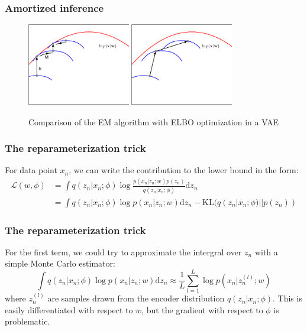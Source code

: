 \documentclass{beamer}
\begin{document}
\begin{frame}
    \frametitle{Amortized inference}
    \begin{figure}
        \caption{Comparison of the EM algorithm with ELBO optimization in a VAE}
        \includegraphics[width=0.4\textwidth]{Figure_9_a.pdf}
        \includegraphics[width=0.4\textwidth]{Figure_9_b.pdf}
    \end{figure}
\end{frame}

\begin{frame}
    \frametitle{The reparameterization trick}
    For data point $x_{n}$, we can write the contribution to the lower bound in the form:
    \begin{align*}
        \mathcal{L}(w,\phi)&=\int{}q(z_{n}|x_{n};\phi)\log\frac{p(x_{n}|z_{n};w)p(z_{n})}{q(z_{n}|x_{n};\phi)}\mathrm{d}z_{n} \\
        &=\int{}q(z_{n}|x_{n};\phi)\log{}p(x_{n}|z_{n};w)\mathrm{d}z_{n}-\mathrm{KL}(q(z_{n}|x_{n};\phi)||p(z_{n}))
    \end{align*}
\end{frame}

\begin{frame}
    \frametitle{The reparameterization trick}
    For the first term, we could try to approximate the intergral over $z_{n}$ with a simple Monte Carlo estimator:
    \begin{equation*}
        \int{}q(z_{n}|x_{n};\phi)\log{}p(x_{n}|z_{n};w)\mathrm{d}z_{n}\approx\frac{1}{L}\sum_{l=1}^{L}\log{}p(x_{n}|z_{n}^{(l)};w)
    \end{equation*}
    where $z_{n}^{(l)}$ are samples drawn from the encoder distribution $q(z_{n}|x_{n};\phi)$. This is easily differentiated with respect to $w$, but the gradient with respect to $\phi$ is problematic.
\end{frame}
\end{document}
